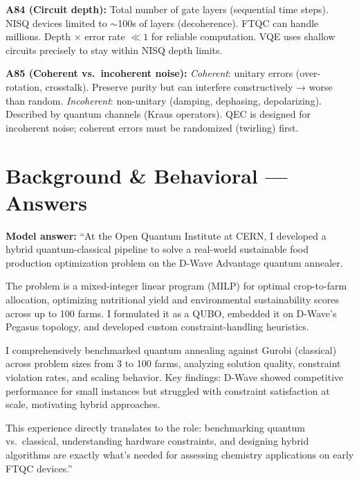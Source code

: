 \documentclass[11pt,a4paper]{article}
\begin{document}
\begin{answerbox}
\textbf{A84 (Circuit depth):} Total number of gate layers (sequential time steps). NISQ devices limited to $\sim$100s of layers (decoherence). FTQC can handle millions. Depth $\times$ error rate $\ll 1$ for reliable computation. VQE uses shallow circuits precisely to stay within NISQ depth limits.

\textbf{A85 (Coherent vs.\ incoherent noise):} \textit{Coherent}: unitary errors (over-rotation, crosstalk). Preserve purity but can interfere constructively → worse than random. \textit{Incoherent}: non-unitary (damping, dephasing, depolarizing). Described by quantum channels (Kraus operators). QEC is designed for incoherent noise; coherent errors must be randomized (twirling) first.
\end{answerbox}


\section{Background \& Behavioral --- Answers}

\begin{answerbox}
\textbf{Model answer:} ``At the Open Quantum Institute at CERN, I developed a hybrid quantum-classical pipeline to solve a real-world sustainable food production optimization problem on the D-Wave Advantage quantum annealer.

The problem is a mixed-integer linear program (MILP) for optimal crop-to-farm allocation, optimizing nutritional yield and environmental sustainability scores across up to 100 farms. I formulated it as a QUBO, embedded it on D-Wave's Pegasus topology, and developed custom constraint-handling heuristics.

I comprehensively benchmarked quantum annealing against Gurobi (classical) across problem sizes from 3 to 100 farms, analyzing solution quality, constraint violation rates, and scaling behavior. Key findings: D-Wave showed competitive performance for small instances but struggled with constraint satisfaction at scale, motivating hybrid approaches.

This experience directly translates to the role: benchmarking quantum vs.\ classical, understanding hardware constraints, and designing hybrid algorithms are exactly what's needed for assessing chemistry applications on early FTQC devices.''
\end{answerbox}
\end{document}
